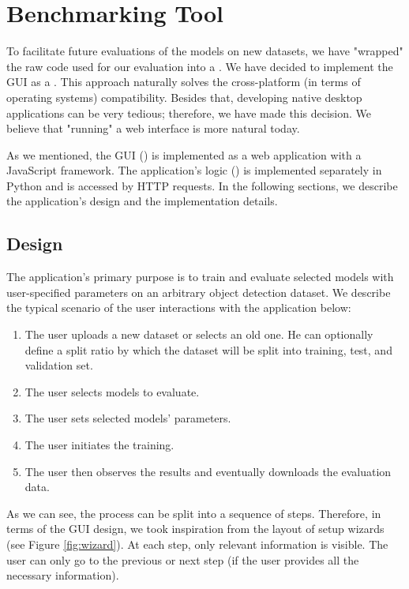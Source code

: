 \chapter{Benchmarking Tool}
To facilitate future evaluations of the models on new datasets, we have
"wrapped" the raw code used for our evaluation into a . We have decided to implement the GUI as a
. This approach naturally solves the cross-platform (in
terms of operating systems) compatibility. Besides that, developing native
desktop applications can be very tedious; therefore, we have made this decision.
We believe that "running" a web interface is more natural today.

As we mentioned, the GUI () is implemented as a web application
with a JavaScript framework. The application's logic () is
implemented separately in Python and is accessed by HTTP requests. In the
following sections, we describe the application's design and the implementation
details.

\section{Design}
The application's primary purpose is to train and evaluate selected models with
user-specified parameters on an arbitrary object detection dataset. We describe
the typical scenario of the user interactions with the application below:
\renewcommand{\theenumi}{\arabic{enumi}}
\begin{enumerate}
    \item The user uploads a new dataset or selects an old one. He can
          optionally define a split ratio by which the dataset will be split
          into training, test, and validation set.
    \item The user selects models to evaluate.
    \item The user sets selected models' parameters.
    \item The user initiates the training.
    \item The user then observes the results and eventually downloads the
          evaluation data.
\end{enumerate}
As we can see, the process can be split into a sequence of steps. Therefore, in
terms of the GUI design, we took inspiration from the layout of setup wizards
(see Figure \ref{fig:wizard}). At each step, only relevant information is
visible. The user can only go to the previous or next step (if the user provides
all the necessary information).

